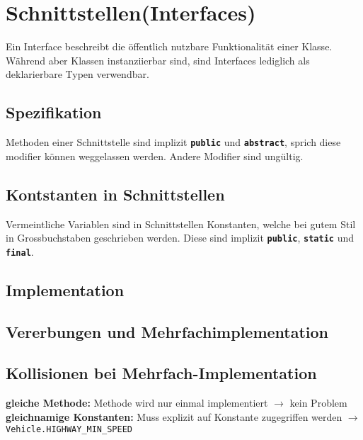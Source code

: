 \section*{Schnittstellen(Interfaces)}
	Ein Interface beschreibt die öffentlich nutzbare Funktionalität einer Klasse. Während aber Klassen instanziierbar sind, sind Interfaces lediglich als deklarierbare Typen verwendbar.\\
	\begin{minipage}[t]{8.3cm}
		\subsection*{Spezifikation}
			
			Methoden einer Schnittstelle sind implizit \textbf{\texttt{public}} und \textbf{\texttt{abstract}}, sprich diese modifier können weggelassen werden. Andere Modifier sind ungültig.
		\subsection*{Kontstanten in Schnittstellen}
			
			Vermeintliche Variablen sind in Schnittstellen Konstanten, welche bei gutem Stil in Grossbuchstaben geschrieben werden. Diese sind implizit \textbf{\texttt{public}}, \textbf{\texttt{static}} und \textbf{\texttt{final}}.
	\end{minipage}
	\hspace*{0.5cm}
	\begin{minipage}[t]{10cm}
		\subsection*{Implementation}
			
		\subsection*{Vererbungen und Mehrfachimplementation}
			
	\end{minipage}
	\subsection*{Kollisionen bei Mehrfach-Implementation}
	\textbf{gleiche Methode:} Methode wird nur einmal implementiert $\rightarrow$ kein Problem\\
	\textbf{gleichnamige Konstanten:} Muss explizit auf Konstante zugegriffen werden $\rightarrow$ \lstinline|Vehicle.HIGHWAY_MIN_SPEED|
	